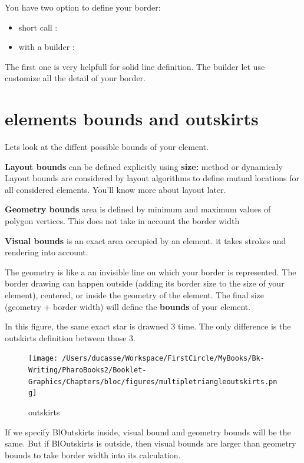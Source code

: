 \documentclass[10pt,twoside,english]{_support/latex/sbabook/sbabook}
\begin{document}
You have two option to define your border:

\begin{itemize}
    \item short call : 
    \item with a builder :
\end{itemize}

The first one is very helpfull for solid line definition. The builder let use
customize all the detail of your border.

\section{elements bounds and outskirts}
Lets look at the diffent possible bounds of your element.

\textbf{Layout bounds} can be defined explicitly using \textbf{size:} method or dynamicaly
Layout bounds are considered by layout algorithms to define mutual locations
for all considered elements. You'll know more about layout later.

\textbf{Geometry bounds} area is defined by minimum and maximum values of polygon
vertices. This does not take in account the border width

\textbf{Visual bounds} is an exact area occupied by an element. it takes strokes
and rendering into account.

The geometry is like a an invisible line on which your border is represented.
The border drawing can happen outside (adding its border size to the size of
your element), centered, or inside the geometry of the element. The final size
(geometry + border width) will define the \textbf{bounds} of your element.

In this figure, the same exact star is drawned 3 time. The only difference is
the outskirts definition between those 3.

\begin{figure}[htpb]
\begin{center}
\texttt{[image: /Users/ducasse/Workspace/FirstCircle/MyBooks/Bk-Writing/PharoBooks2/Booklet-Graphics/Chapters/bloc/figures/multipletriangleoutskirts.png]}
\caption{outskirts}
\end{center}
\end{figure}


If we specify BlOutskirts inside, visual bound and geometry bounds will be the
same. But if BlOutskirts is outside, then visual bounds are larger than
geometry bounds to take border width into its calculation.
\end{document}
